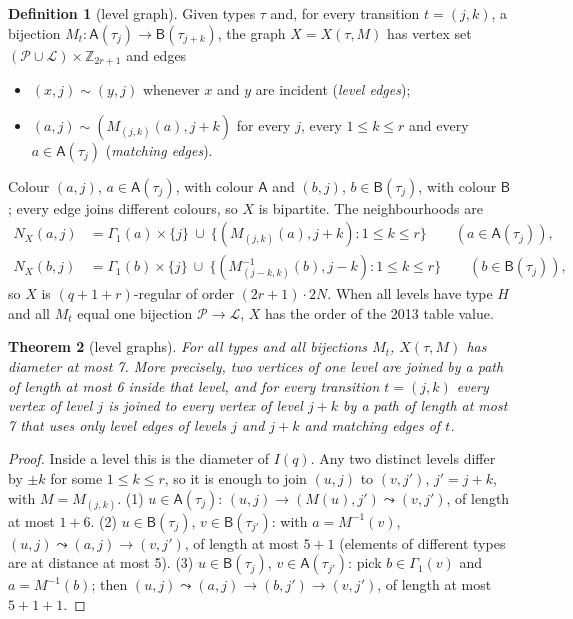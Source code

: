 \documentclass[11pt]{amsart}
\newtheorem{theorem}{Theorem}[section]
\theoremstyle{definition}
\newtheorem{definition}[theorem]{Definition}
\theoremstyle{remark}
\numberwithin{equation}{section}
\newcommand{\Z}{\mathbb Z}
\newcommand{\cL}{\mathcal L}
\newcommand{\cP}{\mathcal P}
\begin{document}
\begin{definition}[level graph]\label{def:levelgraph}
Given types $\tau$ and, for every transition $t=(j,k)$, a bijection $M_t:\mathsf A(\tau_j)\to\mathsf B(\tau_{j+k})$, the
graph $X=X(\tau,M)$ has vertex set $(\cP\cup\cL)\times\Z_{2r+1}$ and edges
\begin{itemize}
\item $(x,j)\sim(y,j)$ whenever $x$ and $y$ are incident (\emph{level edges});
\item $(a,j)\sim(M_{(j,k)}(a),j+k)$ for every $j$, every $1\le k\le r$ and every $a\in\mathsf A(\tau_j)$ (\emph{matching
  edges}).
\end{itemize}
\end{definition}

Colour $(a,j)$, $a\in\mathsf A(\tau_j)$, with colour $\mathsf A$ and $(b,j)$, $b\in\mathsf B(\tau_j)$, with colour
$\mathsf B$; every edge joins different colours, so $X$ is bipartite. The neighbourhoods are
\begin{align*}
N_X(a,j)&=\Gamma_1(a)\times\{j\}\ \cup\ \{(M_{(j,k)}(a),j+k):1\le k\le r\}\qquad(a\in\mathsf A(\tau_j)),\\
N_X(b,j)&=\Gamma_1(b)\times\{j\}\ \cup\ \{(M^{-1}_{(j-k,k)}(b),j-k):1\le k\le r\}\qquad(b\in\mathsf B(\tau_j)),
\end{align*}
so $X$ is $(q+1+r)$-regular of order $(2r+1)\cdot2N$. When all levels have type $H$ and all $M_t$ equal one bijection
$\cP\to\cL$, $X$ has the order of the 2013 table value.

\begin{theorem}[level graphs]\label{thm:levelgraph}
For all types and all bijections $M_t$, $X(\tau,M)$ has diameter at most 7. More precisely, two vertices of one level are
joined by a path of length at most 6 inside that level, and for every transition $t=(j,k)$ every vertex of level $j$ is
joined to every vertex of level $j+k$ by a path of length at most 7 that uses only level edges of levels $j$ and $j+k$ and
matching edges of $t$.
\end{theorem}

\begin{proof}
Inside a level this is the diameter of $I(q)$. Any two distinct levels differ by $\pm k$ for some $1\le k\le r$, so it is
enough to join $(u,j)$ to $(v,j')$, $j'=j+k$, with $M=M_{(j,k)}$. (1) $u\in\mathsf A(\tau_j)$: $(u,j)\to(M(u),j')\leadsto
(v,j')$, of length at most $1+6$. (2) $u\in\mathsf B(\tau_j)$, $v\in\mathsf B(\tau_{j'})$: with $a=M^{-1}(v)$,
$(u,j)\leadsto(a,j)\to(v,j')$, of length at most $5+1$ (elements of different types are at distance at most 5). (3)
$u\in\mathsf B(\tau_j)$, $v\in\mathsf A(\tau_{j'})$: pick $b\in\Gamma_1(v)$ and $a=M^{-1}(b)$; then
$(u,j)\leadsto(a,j)\to(b,j')\to(v,j')$, of length at most $5+1+1$.
\end{proof}
\end{document}
